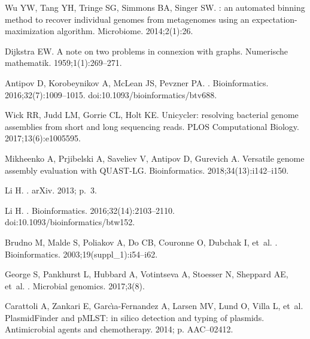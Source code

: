 \documentclass[10pt,letterpaper]{article}
\begin{document}
\begin{thebibliography}{10}
Wu YW, Tang YH, Tringe SG, Simmons BA, Singer SW.
: an automated binning method to recover individual genomes
  from metagenomes using an expectation-maximization algorithm.
\newblock Microbiome. 2014;2(1):26.

Dijkstra EW.
\newblock A note on two problems in connexion with graphs.
\newblock Numerische mathematik. 1959;1(1):269--271.

Antipov D, Korobeynikov A, McLean JS, Pevzner PA.
.
\newblock Bioinformatics. 2016;32(7):1009--1015.
\newblock doi:{10.1093/bioinformatics/btv688}.

Wick RR, Judd LM, Gorrie CL, Holt KE.
\newblock Unicycler: resolving bacterial genome assemblies from short and long
  sequencing reads.
\newblock PLOS Computational Biology. 2017;13(6):e1005595.

Mikheenko A, Prjibelski A, Saveliev V, Antipov D, Gurevich A.
\newblock Versatile genome assembly evaluation with {QUAST-LG}.
\newblock Bioinformatics. 2018;34(13):i142--i150.

Li H.
.
\newblock arXiv. 2013; p.~3.

Li H.
.
\newblock Bioinformatics. 2016;32(14):2103--2110.
\newblock doi:{10.1093/bioinformatics/btw152}.

Brudno M, Malde S, Poliakov A, Do CB, Couronne O, Dubchak I, et~al.
.
\newblock Bioinformatics. 2003;19(suppl\_1):i54--i62.

George S, Pankhurst L, Hubbard A, Votintseva A, Stoesser N, Sheppard AE, et~al.
.
\newblock Microbial genomics. 2017;3(8).

Carattoli A, Zankari E, Garc{\`\i}a-Fernandez A, Larsen MV, Lund O, Villa L,
  et~al.
\newblock PlasmidFinder and pMLST: in silico detection and typing of plasmids.
\newblock Antimicrobial agents and chemotherapy. 2014; p. AAC--02412.


\end{thebibliography}
\end{document}
